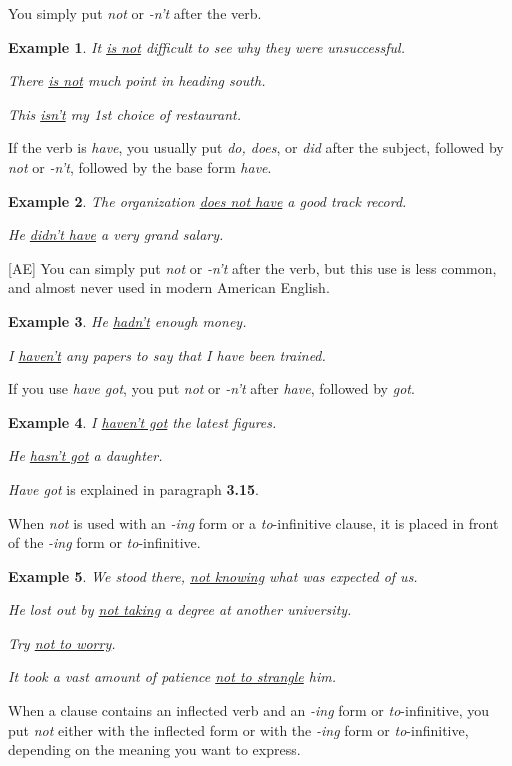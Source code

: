 \documentclass[oneside]{book}
\numberwithin{equation}{section}
\newtheorem{example}{Example}[section]
\begin{document}
You simply put \textit{not} or \textit{-n't} after the verb.
\begin{example}
    It \underline{is not} difficult to see why they were unsuccessful.
    
    There \underline{is not} much point in heading south.
    
    This \underline{isn't} my 1st choice of restaurant.
\end{example}
%
\noindent{} If the verb is \textit{have}, you usually put \textit{do, does}, or \textit{did} after the subject, followed by \textit{not} or \textit{-n't}, followed by the base form \textit{have}.
\begin{example}
    The organization \underline{does not have} a good track record.
    
    He \underline{didn't have} a very grand salary.
\end{example}
[AE] You can simply put \textit{not} or \textit{-n't} after the verb, but this use is less common, and almost never used in modern American English.
\begin{example}
    He \underline{hadn't} enough money.
    
    I \underline{haven't} any papers to say that I have been trained.
\end{example}
If you use \textit{have got}, you put \textit{not} or \textit{-n't} after \textit{have}, followed by \textit{got}.
\begin{example}
    I \underline{haven't got} the latest figures.
    
    He \underline{hasn't got} a daughter.
\end{example}
\textit{Have got} is explained in paragraph \textbf{3.15}.

%
\noindent{} When \textit{not} is used with an \textit{-ing} form or a \textit{to}-infinitive clause, it is placed in front of the \textit{-ing} form or \textit{to}-infinitive.
\begin{example}
    We stood there, \underline{not knowing} what was expected of us.
    
    He lost out by \underline{not taking} a degree at another university.
    
    Try \underline{not to worry}.
    
    It took a vast amount of patience \underline{not to strangle} him.
\end{example}
%
\noindent{} When a clause contains an inflected verb and an \textit{-ing} form or \textit{to}-infinitive, you put \textit{not} either with the inflected form or with the \textit{-ing} form or \textit{to}-infinitive, depending on the meaning you want to express.
\end{document}
